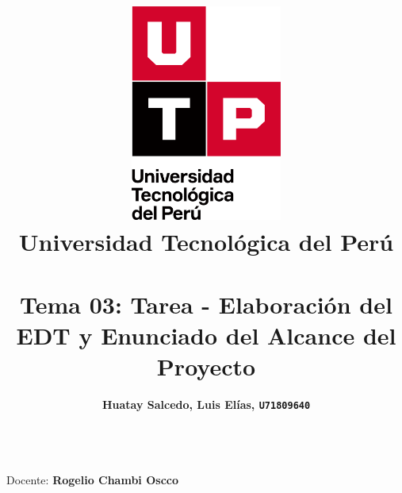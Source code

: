 \documentclass{article}
\title{
  \pagenumbering{gobble}
  \vspace{1cm}
  \includegraphics[width=5cm,clip,trim=0cm 2.9cm 0cm 0cm]{./assets/isotipo-utp.png} \\
  \vspace{0.5cm}
  \textbf{Universidad Tecnológica del Perú} \\
  \vspace{0.5cm}
  \text{Gestión de Proyectos} \\
  \vspace{1cm}
    {\huge \textbf{Tema 03: Tarea - Elaboración del EDT y Enunciado del Alcance del Proyecto}} \\
  \vspace{1cm}
}
\author{
  \begin{tabular}{ll}
    \textbf{Huatay Salcedo, Luis Elías, \texttt{U71809640}}\\
  \end{tabular} \\
}
\begin{document}
\maketitle
\begin{center}
  Docente: \textbf{Rogelio Chambi Oscco}
\end{center}

%
%

\newpage



\newpage
\setcounter{page}{1}  









\end{document}
